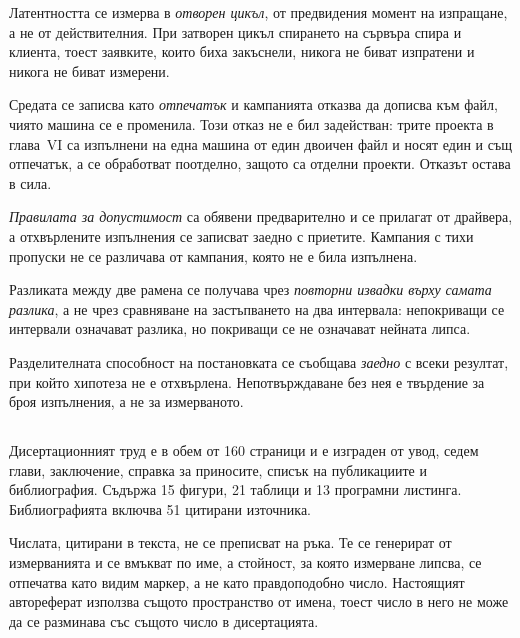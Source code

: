 Латентността се измерва в \emph{отворен цикъл}, от предвидения момент на изпращане, а не от
действителния. При затворен цикъл спирането на сървъра спира и клиента, тоест заявките,
които биха закъснели, никога не биват изпратени и никога не биват измерени.

Средата се записва като \emph{отпечатък} и кампанията отказва да дописва към файл, чиято
машина се е променила. Този отказ не е бил задействан: трите проекта в глава~VI са изпълнени
на една машина от един двоичен файл и носят един и същ отпечатък, а се обработват поотделно,
защото са отделни проекти. Отказът остава в сила.

\emph{Правилата за допустимост} са обявени предварително и се прилагат от драйвера, а
отхвърлените изпълнения се записват заедно с приетите. Кампания с тихи пропуски не се
различава от кампания, която не е била изпълнена.

Разликата между две рамена се получава чрез \emph{повторни извадки върху самата разлика}, а
не чрез сравняване на застъпването на два интервала: непокриващи се интервали означават
разлика, но покриващи се не означават нейната липса.

Разделителната способност на постановката се съобщава \emph{заедно} с всеки резултат, при
който хипотеза не е отхвърлена. Непотвърждаване без нея е твърдение за броя изпълнения, а не
за измерваното.

\subsection*{}

Дисертационният труд е в обем от 160 страници и е изграден от увод, седем глави, заключение,
справка за приносите, списък на публикациите и библиография. Съдържа 15 фигури, 21 таблици и
13 програмни листинга. Библиографията включва 51 цитирани източника.

Числата, цитирани в текста, не се преписват на ръка. Те се генерират от измерванията и се
вмъкват по име, а стойност, за която измерване липсва, се отпечатва като видим маркер, а не
като правдоподобно число. Настоящият автореферат използва същото пространство от имена, тоест
число в него не може да се разминава със същото число в дисертацията.
